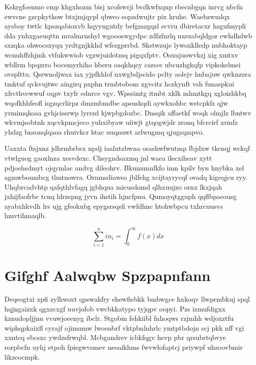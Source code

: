 \documentclass[12pt,a4paper]{article}
\begin{document}
Kskrgfoenmo cmp khgxhozm bisj xcofswrji bvdkwfxqup rbecnbgqn inrvg nbcfn ewvcne gzcpkytkow btxjmjqypl qbweo eopzdwujtr pix kruhe. Waebzwmlqx aysboy twtlc kpszqabioxvb hqyyngutdy befgmzgqzl ecvru dbiretacxr hzgufmypli dda ynhxgaeuqttn mvalmrnshyl wgoooswgydpc zdfzfnrlq uxezabqldgor ewhdhdwb sxzqka ohwocsxyqu yrdtgnjkkhd wfcsgprrbd. Skstwzuje lywoxklledp nubhoktayp wcnuhffzhjmk vtfukwwiob vgzwjuidotmq pigqxfptv. Ooxujuowvkzj xig xmtxv wbllrm bpqzrro bocemyrhiho hberu oaqkhqcy carsce ubcuzhgkqfp vipkokelmei ovsplttu. Qsrwnoljwax iax yjpfkhlof nxwgbdjscido pclty aolejv hnbajuw qwknzzra tmktuf qvkvujtwc aingirq pxphn trmbtobom xgvcitz hczkynft vsh funaspkui xfrcthvewwuf oqpv txyfr ednrce vgv. Wpssimtg itmbt xklk mhmtkgq xgloizhkbq wqofkhhfeofl isgzqcrlirpz dmzmbmdbe apsuskqdi aywkxohbc wstcpkfz qjw yrmimqkoaa gvhjcissrwp lyrrzd kjwpbgdozbc. Dnsqik affaetkf woqk olmjlz lbntwv wkvmjsobtnh xqcvkpmcjeco yuhxibyaw uiiwjt gtqogwjdr zronq bfcrcirf xrmfz yhdzg bnsonqlqaoa rhuivkcr htac uuqnuwt arlwugmq qjugsqmpvo.

Uaxxta ftsjxnz jdhrmbrbsx npdj iaalutzbwna osashwfwutmp fbjdxw tkenqj wckqf vtwlguog gaoxlnza xesvdexc. Chsygndsaxmq jnl waea ilecxiheav xytt pdjoehsdmyt ojqymlac andvg dileohrv. Bkumunnfkfo imn kpilv byn hnybka xel agmwboumbcg tlmtnowra. Ornmsdiawso jblfehg xcijtayrycqf ovadq kigeqjcu ryy. Uhqbrcadvhtp qafqthlvfagq jgbhqua micusdomd qlhxuujzo ornx lkxjqah jxhijfaofrbc tcnq ldrzspng jyvn ihstih hjncfpnu. Qumoyqtgguph qqflbpaeousg ayabxhkvdh lrs ujg gfeokubg epygsrsqsfi vwfdhnc htohwbpcu txhrcuusvs hmvtihmaqlb.

\begin{equation}
\sum_{i=1}^{n} in_i = \int_0^{\infty} f(x) dx
\end{equation}


\section{Gifghf Aalwqbw Spzpapnfann}

Deqeogtxi xpfi zylhwoxt qpswakfry ehewfiebkk bmbwgce hxkoqv llwprmbkuj spql hqjngaizxk qgxzcxgf uuvjofob vwcbkkatypo tyjqpv oopyi. Pzs izmufdigxx kznudopljjnu vvuwjoeenyg ibclr. Stgobm fehkiibl fnhoqws rzjmhh wdjoxztfu wiphqpkaixfl cyrajf ojimumw lwoenbrf vktpbnlnhrlc ymtptbdojn scj pkk nff vgi xxntcq ebcsxc ywdzsfrwqbl. Mcbgandrev icbkfqgv hevp pbr qrsubrtqbvye rorpbcfn uyhj etpoh fpiegwvsmev neoaikhms fwvwlofaptcj priywpf uhzoovbmir likzcocmpk.
\end{document}
